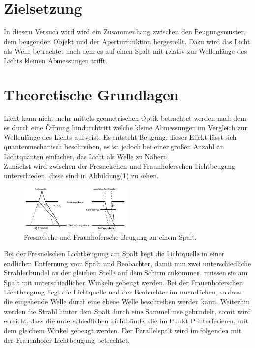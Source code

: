 \section{Zielsetzung}

    \noindent In diesem Versuch wird wird ein Zusammenhang zwischen den Beugungsmuster, dem beugenden Objekt und der Aperturfunktion hergestellt.
    Dazu wird das Licht als Welle betrachtet nach dem es auf einen Spalt mit relativ zur Wellenlänge des Lichts kleinen Abmessungen trifft.

\section{Theoretische Grundlagen}

    \noindent Licht kann nicht mehr mittels geometrischen Optik betrachtet werden nach dem es durch eine Öffnung hindurchtritt welche kleine 
    Abmessungen im Vergleich zur Wellenlänge des Lichts aufweist. Es entsteht Beugung, dieser Effekt lässt sich quantenmechanisch beschreiben, 
    es ist jedoch bei einer großen Anzahl an Lichtquanten einfacher, das Licht als Welle zu Nähern.\\

    \noindent Zunächst wird zwischen der Fresnelschen und Fraunhoferschen Lichtbeugung unterschieden, diese  sind in Abbildung(\ref{img:fresnel}) 
    zu sehen. 

    \begin{figure}[ht]
        \centering
        \includegraphics[width=0.5\textwidth]{latex/images/fresnel.PNG}
        \caption{Fresnelsche und Fraunhofersche Beugung an einem Spalt\protect \cite{V406}.}
        \label{img:fresnel}
    \end{figure}

    \noindent Bei der Fresnelschen Lichtbeugung am Spalt liegt die Lichtquelle in einer endlichen Entfernung vom Spalt und Beobachter, 
    damit nun zwei unterschiedliche Strahlenbündel an der gleichen Stelle auf dem Schirm ankommen, müssen sie am Spalt mit unterschiedlichen 
    Winkeln gebeugt werden. Bei der Frauenhoferschen Lichtbeugung liegt die Lichtquelle und der Beobachter im unendlichen, so dass die eingehende Welle durch 
    eine ebene Welle beschreiben werden kann. Weiterhin werden die Strahl hinter dem Spalt durch eine Sammellinse gebündelt, somit wird 
    erreicht, dass die unterschiedlichen Lichtbündel die im Punkt P interferieren, mit dem gleichem Winkel gebeugt werden. Der Parallelspalt 
    wird im folgenden mit der Frauenhofer Lichtbeugung betrachtet.

